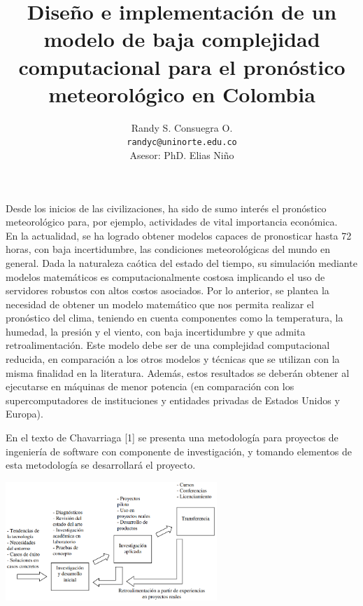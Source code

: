 \documentclass[25pt, portrait]{tikzposter}
\title{{\normalfont Diseño e implementación de un modelo de baja complejidad computacional para el pronóstico meteorológico en Colombia}}
\author{Randy S. Consuegra O. \\
\texttt{randyc@uninorte.edu.co}\\
Asesor: PhD. Elias Niño \\}
\institute{Departamento de Ingeniería de Sistemas y Computación\\
  Universidad del Norte}
\begin{document}
\maketitle

{
    Desde los inicios de las civilizaciones, ha sido de sumo interés el pronóstico meteorológico para, por ejemplo, actividades de vital importancia económica. \\
    En la actualidad, se ha logrado obtener modelos capaces de pronosticar hasta 72 horas, con baja incertidumbre, las condiciones meteorológicas del mundo en general. Dada la naturaleza caótica del estado del tiempo, su simulación mediante modelos matemáticos es computacionalmente costosa implicando el uso de servidores robustos con altos costos asociados. Por lo anterior, se plantea la necesidad de obtener un modelo matemático que nos permita realizar el pronóstico del clima, teniendo en cuenta componentes como la temperatura, la humedad, la presión y el viento, con baja incertidumbre y que admita retroalimentación. Este modelo debe ser de una complejidad computacional reducida, en comparación a los otros modelos y técnicas que se utilizan con la misma finalidad en la literatura. Además, estos resultados se deberán obtener al ejecutarse en máquinas de menor potencia (en comparación con los supercomputadores de instituciones y entidades privadas de Estados Unidos y Europa). 
}



{
    En el texto de Chavarriaga [1] se presenta una metodología para proyectos de ingeniería de software con componente de investigación, y tomando elementos de esta metodología se desarrollará el proyecto.
    \begin{tikzfigure}
        \includegraphics[width=0.6\textwidth]{images/metodologia.PNG}
    \end{tikzfigure}
}
\end{document}

